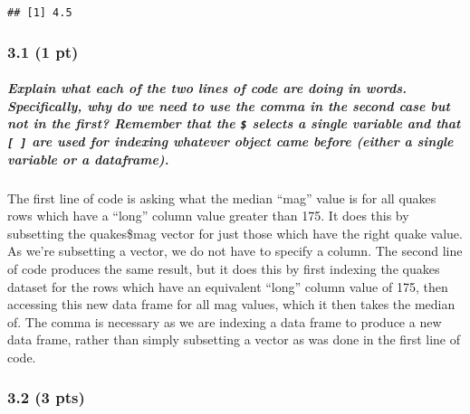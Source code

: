 \documentclass[
]{article}
\begin{document}
\begin{verbatim}
## [1] 4.5
\end{verbatim}

\hypertarget{pt}{%
\subsubsection{3.1 (1 pt)}\label{pt}}

\hypertarget{explain-what-each-of-the-two-lines-of-code-are-doing-in-words.-specifically-why-do-we-need-to-use-the-comma-in-the-second-case-but-not-in-the-first-remember-that-the-selects-a-single-variable-and-that-are-used-for-indexing-whatever-object-came-before-either-a-single-variable-or-a-dataframe.}{%
\subparagraph{\texorpdfstring{Explain what each of the two lines of code
are doing in words. Specifically, why do we need to use the comma in the
second case but not in the first? Remember that the \texttt{\$} selects
a single variable and that \texttt{{[}\ {]}} are used for indexing
whatever object came before (either a single variable or a
dataframe).}{Explain what each of the two lines of code are doing in words. Specifically, why do we need to use the comma in the second case but not in the first? Remember that the \$ selects a single variable and that {[} {]} are used for indexing whatever object came before (either a single variable or a dataframe).}}\label{explain-what-each-of-the-two-lines-of-code-are-doing-in-words.-specifically-why-do-we-need-to-use-the-comma-in-the-second-case-but-not-in-the-first-remember-that-the-selects-a-single-variable-and-that-are-used-for-indexing-whatever-object-came-before-either-a-single-variable-or-a-dataframe.}}

The first line of code is asking what the median ``mag'' value is for
all quakes rows which have a ``long'' column value greater than 175. It
does this by subsetting the quakes\$mag vector for just those which have
the right quake value. As we're subsetting a vector, we do not have to
specify a column. The second line of code produces the same result, but
it does this by first indexing the quakes dataset for the rows which
have an equivalent ``long'' column value of 175, then accessing this new
data frame for all mag values, which it then takes the median of. The
comma is necessary as we are indexing a data frame to produce a new data
frame, rather than simply subsetting a vector as was done in the first
line of code.

\hypertarget{pts}{%
\subsubsection{3.2 (3 pts)}\label{pts}}
\end{document}
